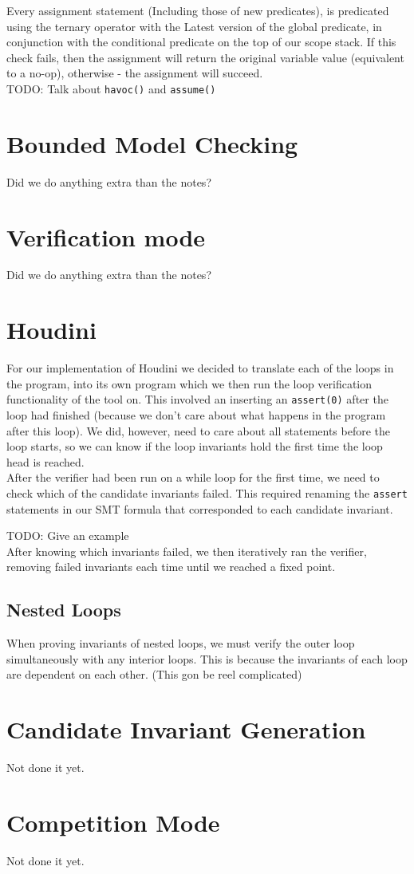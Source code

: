 \documentclass[11pt]{article}
\begin{document}
Every assignment statement (Including those of new predicates), is predicated using the ternary operator
with the Latest version of the global predicate, in conjunction with the conditional predicate on the
top of our scope stack. If this check fails, then the assignment will return the original variable value
(equivalent to a no-op), otherwise - the assignment will succeed. \\

TODO: Talk about \verb|havoc()| and \verb|assume()|

\section{Bounded Model Checking}
Did we do anything extra than the notes?
\section{Verification mode}
Did we do anything extra than the notes?
\section{Houdini}

For our implementation of Houdini we decided to translate each of the loops in the program, into its own
program which we then run the loop verification functionality of the tool on. This involved an inserting an
\verb|assert(0)| after the loop had finished (because we don't care about what happens in the program after
this loop). We did, however, need to care about all statements before the loop starts, so we can know if the
loop invariants hold the first time the loop head is reached.\\

After the verifier had been run on a while loop for the first time, we need to check which of the candidate
invariants failed. This required renaming the \verb|assert| statements in our SMT formula that corresponded
to each candidate invariant.

TODO: Give an example \\

After knowing which invariants failed, we then iteratively ran the verifier, removing failed invariants each time
until we reached a fixed point.

\subsection{Nested Loops}

When proving invariants of nested loops, we must verify the outer loop simultaneously with any interior loops. This
is because the invariants of each loop are dependent on each other. (This gon be reel complicated)

\section{Candidate Invariant Generation}
Not done it yet.
\section{Competition Mode}
Not done it yet.
\end{document}
